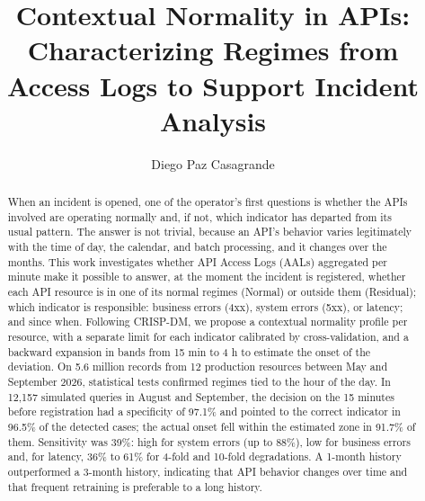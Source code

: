 \documentclass[sigconf,nonacm]{acmart}
\begin{document}
\title{Contextual Normality in APIs: Characterizing Regimes from Access Logs to Support Incident Analysis}

\author{Diego Paz Casagrande}

\renewcommand{\shortauthors}{D. P. Casagrande}

\begin{abstract}
When an incident is opened, one of the operator's first questions is whether the APIs involved are operating normally and, if not, which indicator has departed from its usual pattern. The answer is not trivial, because an API's behavior varies legitimately with the time of day, the calendar, and batch processing, and it changes over the months. This work investigates whether API Access Logs (AALs) aggregated per minute make it possible to answer, at the moment the incident is registered, whether each API resource is in one of its normal regimes (Normal) or outside them (Residual); which indicator is responsible: business errors (4xx), system errors (5xx), or latency; and since when. Following CRISP-DM, we propose a contextual normality profile per resource, with a separate limit for each indicator calibrated by cross-validation, and a backward expansion in bands from 15 min to 4 h to estimate the onset of the deviation. On 5.6 million records from 12 production resources between May and September 2026, statistical tests confirmed regimes tied to the hour of the day. In 12,157 simulated queries in August and September, the decision on the 15 minutes before registration had a specificity of 97.1\% and pointed to the correct indicator in 96.5\% of the detected cases; the actual onset fell within the estimated zone in 91.7\% of them. Sensitivity was 39\%: high for system errors (up to 88\%), low for business errors and, for latency, 36\% to 61\% for 4-fold and 10-fold degradations. A 1-month history outperformed a 3-month history, indicating that API behavior changes over time and that frequent retraining is preferable to a long history.
\end{abstract}


\maketitle

\end{document}
